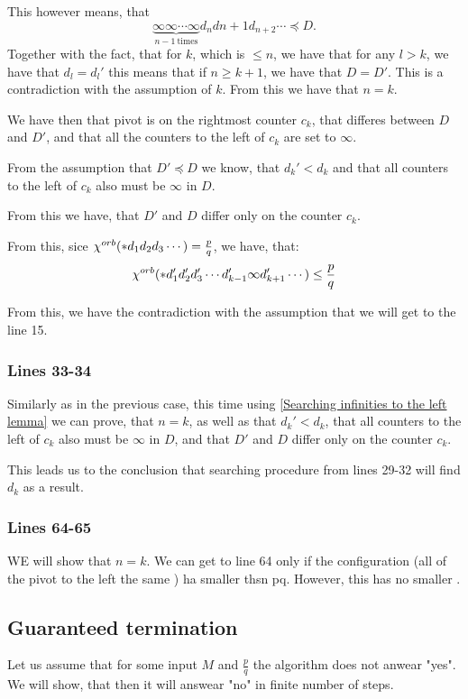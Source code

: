 This however means, that
\begin{equation}
\underbrace{\infty\infty\cdots\infty}_{n-1\ \mathrm{times}}d_nd{n+1}d_{n+2}\cdots \preceq D.
\end{equation}
Together with the fact, that for $k$, which is $\leq n$, we have that 
for any $l > k$, we have that $d_l = d_l'$ this means that if $n \geq k+1$, we have that 
$D = D'$. This is a contradiction with the assumption of $k$. 
From this we have that $n = k$.

We have then that pivot is on the rightmost counter $c_k$, 
that differes between $D$ and $D'$, and 
that all the counters to the left of $c_k$ are set to $\infty$. 

From the assumption that $D' \preceq D$ we know, that $d_k' < d_k$ and that all 
counters to the left of $c_k$ also must be $\infty$ in $D$.  

From this we have, that $D'$ and $D$ differ only on the counter $c_k$. 

From this, sice ${\chi^{orb}(*d_1d_2d_3\cdots)} = \frac{p}{q}$, we have, that: 
\begin{equation}
{\chi^{orb}(*d_1'd_2'd_3'\cdots d_{k-1}'\infty d_{k+1}'\cdots)} \leq \frac{p}{q} 
\end{equation}

From this, we have the contradiction with the assumption that we will get to the line 15. 

\subsubsection{Lines 33-34}
Similarly as in the previous case, this time using \ref{Searching infinities to the left lemma} 
we can prove, that $n=k$, as well as that $d_k' < d_k$, that all 
counters to the left of $c_k$ also must be $\infty$ in $D$, and that 
$D'$ and $D$ differ only on the counter $c_k$.

This leads us to the conclusion that searching procedure from lines 
29-32 will find $d_k$ as a result. 

\subsubsection{Lines 64-65}
WE will show that $n = k$. We can get to line 64 only if the configuration (all of the pivot to 
the left the same ) ha \Eoc smaller thsn pq. However, this has no smaller . 

\subsection{Guaranteed termination}
Let us assume that for some input $M$ and $\frac{p}{q}$ the algorithm does not anwear "yes". 
We will show, that then it will answear "no" in finite number of steps.

